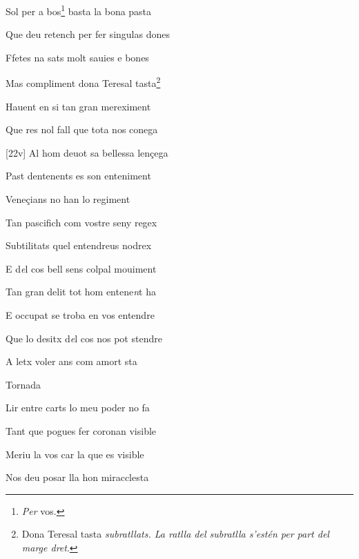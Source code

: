 \documentclass[12pt]{article}
\begin{document}
\begin{estrofa}

 Sol per a bos\footnote{\textit{Per} vos.} basta la bona pasta

 Que deu retench per fer singulas dones

 Ffetes na sats molt sauies e bones

 Mas compliment dona Teresal tasta\footnote{Dona Teresal tasta
\textit{subratllats. La ratlla del subratlla s'est\'{e}n per part del marge
dret}.}

 Hauent en si tan gran mereximent

 Que res nol fall que tota nos conega

 [22v] Al hom deuot sa bellessa len\c{c}ega

 Past dentenents es son enteniment

\end{estrofa}



\begin{estrofa}

 Vene\c{c}ians no han lo regiment

 Tan pascifich com vostre seny regex

 Subtilitats quel entendreus nodrex

 E d\textit{e}l cos bell sens colpal mouiment

 Tan gran delit tot hom entene\textit{n}t ha

 E occupat se troba en vos entendre

 Que lo desitx d\textit{e}l cos nos pot stendre

 A letx voler ans com amort sta

\end{estrofa}


\begin{estrofaExtra}%




\begin{tornada}

Tornada

\end{tornada}


\end{estrofaExtra}


\begin{estrofa}

 Lir entre carts lo meu poder no fa

 Tant que pogues fer coronan visible

 Meriu la vos car la que es visible

 Nos deu posar lla hon miracclesta

\end{estrofa}
\end{document}
